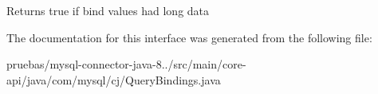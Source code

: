 \begin{DoxyReturn}{Returns}
true if bind values had long data 
\end{DoxyReturn}


The documentation for this interface was generated from the following file\+:\begin{DoxyCompactItemize}
\item 
pruebas/mysql-\/connector-\/java-\/8../src/main/core-\/api/java/com/mysql/cj/Query\+Bindings.\+java\end{DoxyCompactItemize}
